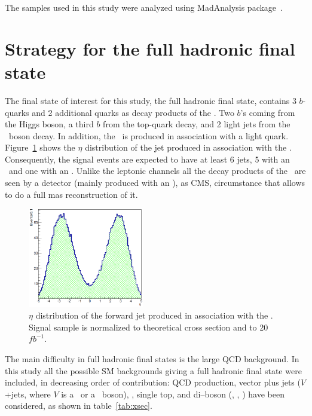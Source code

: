 The samples used in this study were analyzed using MadAnalysis package~\cite{Conte:2012fm, Conte:2014zja}.

\section{Strategy for the full hadronic final state}
\label{sec:Pstra}

The final state of interest for this study, the full hadronic final state, contains 3 $b$-quarks and 2 additional quarks as decay products of the \Tp. Two $b$'s coming from the Higgs boson, a third $b$ from the top-quark decay, and 2 light jets from the \W~boson decay. In addition, the \Tp~is produced in association with a light quark. Figure~\ref{fig:ForwJ} shows the $\eta$ distribution of the jet produced in association with the \Tp. Consequently, the signal events are expected to have at least 6 jets, 5 with an ~and one with an . Unlike the leptonic channels all the decay products of the \Tp~are seen by a detector (mainly produced with an ), as CMS, circumstance that allows to do a full mas reconstruction of it.

\begin{figure}[!Hhtbp]
  \begin{center}
    \includegraphics[width=0.45\textwidth]{figs/Pheno/SixthJet.png}
    \caption{$\eta$ distribution of the forward jet produced in association with the \Tp. Signal sample is normalized to theoretical cross section and to 20~$fb^{-1}$.}
    \label{fig:ForwJ}
  \end{center}
\end{figure}

The main difficulty in full hadronic final states is the large QCD background. In this study all the possible SM backgrounds giving a full hadronic final state were included, in decreasing order of contribution: QCD production, vector plus jets ($V$+jets, where $V$ is a \W~or a \Z~boson), \ttbar, single top, and di--boson (\W\W, \W\Z, \Z\Z) have been considered, as shown in table~\ref{tab:xsec}. 


